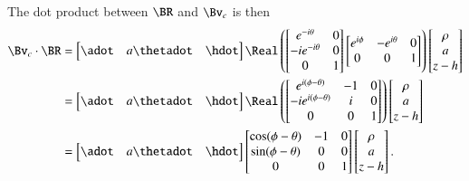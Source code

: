 {The dot product between \(\BR\) and \(\Bv_c\) is then
%
\begin{equation}\label{eqn:relativisticElectrodynamicsExamReflection:1250}
\begin{aligned}
\Bv_c \cdot \BR
&=
\begin{bmatrix}
\adot &
a \thetadot &
\hdot
\end{bmatrix}
\Real \left(
\begin{bmatrix}
e^{-i\theta}  & 0 \\
-i e^{-i\theta}  & 0 \\
0 & 1
\end{bmatrix}
\begin{bmatrix}
e^{i\phi} & -e^{i\theta} & 0 \\
0 & 0 & 1
\end{bmatrix}
\right)
\begin{bmatrix}
\rho \\
a \\
z - h
\end{bmatrix} \\
&=
\begin{bmatrix}
\adot &
a \thetadot &
\hdot
\end{bmatrix}
\Real \left(
\begin{bmatrix}
e^{i(\phi - \theta)} & -1 & 0  \\
-i e^{i(\phi - \theta)} & i & 0 \\
0 & 0 & 1
\end{bmatrix}
\right)
\begin{bmatrix}
\rho \\
a \\
z - h
\end{bmatrix} \\
&=
\begin{bmatrix}
\adot &
a \thetadot &
\hdot
\end{bmatrix}
\begin{bmatrix}
\cos(\phi - \theta) & -1 & 0  \\
\sin(\phi - \theta) & 0 & 0 \\
0 & 0 & 1
\end{bmatrix}
\begin{bmatrix}
\rho \\
a \\
z - h
\end{bmatrix}.
\end{aligned}
\end{equation}

}
